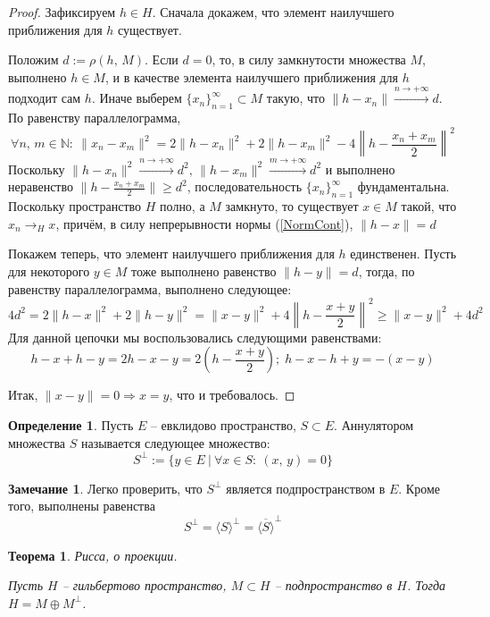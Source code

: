 \documentclass[a4paper,12pt]{article}
\renewcommand{\geq}{\ensuremath{\geqslant}}
\theoremstyle{plain}
\newtheorem{theorem}{Теорема}[section]
\theoremstyle{definition}
\newtheorem{definition}{Определение}[section]
\newtheorem*{note}{Замечание}
\theoremstyle{remark}
\begin{document}
\begin{proof}
	Зафиксируем $h \in H$. Сначала докажем, что элемент наилучшего приближения для $h$ существует.

	Положим $d := \rho(h,\, M)$. Если $d = 0$, то, в силу замкнутости множества $M$, выполнено $h \in M$, и в качестве элемента наилучшего приближения для $h$ подходит сам $h$. Иначе выберем $\{x_n\}_{n = 1}^\infty \subset M$ такую, что $\|h - x_n\| \overset{n \to +\infty}{\to} d$. По равенству параллелограмма,
	\[
		\forall n,\,m \in \mathbb{N} :\: \|x_n - x_m\|^2 = 2 \|h - x_n\|^2 + 2\|h - x_m\|^2 - 4\left\|h - \frac{x_n + x_m}{2}\right\|^2
	\]
	Поскольку $\|h - x_n\|^2 \overset{n \to +\infty}{\to} d^2,\, \|h - x_m\|^2 \overset{m \to +\infty}{\to} d^2$ и выполнено неравенство $\|h - \frac{x_n + x_m}{2}\| \geq d^2$, последовательность $\{x_n\}_{n = 1}^\infty$ фундаментальна. Поскольку пространство $H$ полно, а $M$ замкнуто, то существует $x \in M$ такой, что $x_n \to_H x$, причём, в силу непрерывности нормы (\ref{NormCont}), $\|h - x\| = d$

	Покажем теперь, что элемент наилучшего приближения для $h$ единственен. Пусть для некоторого $y \in M$ тоже выполнено равенство $\|h - y\| = d$, тогда, по равенству параллелограмма, выполнено следующее:
	\[
		4d^2= 2\|h - x\|^2 + 2\|h - y\|^2 = \|x - y\|^2 + 4\left\|h - \frac{x + y}{2}\right\|^2 \geq \|x - y\|^2 + 4d^2
	\]
	Для данной цепочки мы воспользовались следующими равенствами:
	\[
		h - x + h - y = 2h - x - y = 2\left(h - \frac{x + y}{2}\right);\; h - x - h + y = -(x - y)
	\]

	Итак, $\|x - y\| =0 \Rightarrow x = y$, что и требовалось.
\end{proof}

\begin{definition}
	Пусть $E$ -- евклидово пространство, $S \subset E$. Аннулятором множества $S$ называется следующее множество:
	\[
		S^\bot := \{y \in E \:\vert\: \forall x \in S :\: (x,\,y) = 0 \}
	\]
\end{definition}

\begin{note}
	Легко проверить, что $S^\bot$ является подпространством в $E$. Кроме того, выполнены равенства
	\[
		S^\bot = \langle S\rangle^\bot = \overline{\langle S\rangle}^\bot
	\]
\end{note}

\begin{theorem}
	Рисса, о проекции.

	Пусть $H$ -- гильбертово пространство, $M \subset H$ -- подпространство в $H$. Тогда $H = M \oplus M^\bot$.
\end{theorem}
\end{document}
